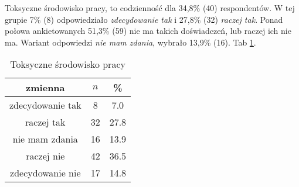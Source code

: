 



Toksyczne środowisko pracy, to codzienność dla 34,8\% (40) respondentów. W tej grupie 7\% (8) odpowiedziało \textit{zdecydowanie tak} i 27,8\% (32) \textit{raczej tak}. Ponad połowa ankietowanych 51,3\% (59) nie ma takich doświadczeń, lub raczej ich nie ma. Wariant odpowiedzi \textit{nie mam zdania}, wybrało 13,9\% (16). Tab \ref{tab:Q8}.

\begin{table}[H]
\caption{Toksyczne środowisko pracy}
\centering
\begin{tabular}{ | c | c | c |}
\hline
zmienna & $n$ & \% \\
\hline
zdecydowanie tak  &  8  & 7.0 \\
\hline
raczej tak  &  32  & 27.8 \\
\hline
nie mam zdania  &  16  & 13.9 \\
\hline
raczej nie  &  42  & 36.5 \\
\hline
zdecydowanie nie  &  17  & 14.8\\
\hline
\end{tabular}
\label{tab:Q8}
\end{table}
